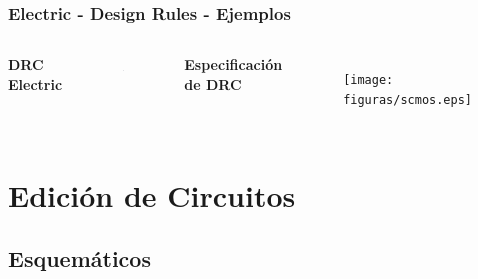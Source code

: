 \documentclass{beamer}
\begin{document}
\begin{frame}
\frametitle{Electric - Design Rules - Ejemplos}
\begin{columns}[c] %
\textbf{DRC Electric}
\begin{figure}
\includegraphics[width=0.99\linewidth]{figuras/configuracionElectric-10B.eps}
\end{figure}

\textbf{Especificación de DRC}
\begin{figure}
\texttt{[image: figuras/scmos.eps]}
\end{figure}

\end{columns}
\end{frame}

\section{Edición de Circuitos}
\begin{frame}
\subsection{Esquemáticos}

\end{frame}
\end{document}
